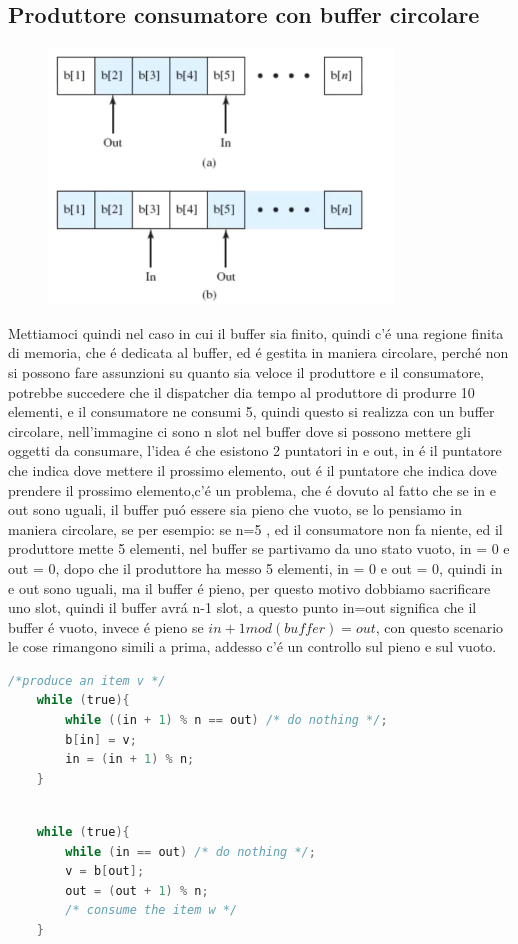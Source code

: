 \subsection{Produttore consumatore con buffer circolare}
\begin{figure}[H]
    \centering
    \includegraphics[width=0.7\linewidth]{immagini/ProduttoreConsumatoreBufferCircolare}
\end{figure}
Mettiamoci quindi nel caso in cui il buffer sia finito, quindi c'é una regione finita di memoria, che é dedicata al buffer,
ed é gestita in maniera circolare, perché non si possono fare assunzioni su quanto sia veloce il produttore e il consumatore,
potrebbe succedere che il dispatcher dia tempo al produttore di produrre 10 elementi, e il consumatore ne consumi 5, quindi
questo si realizza con un buffer circolare, nell'immagine ci sono n slot nel buffer dove si possono mettere gli oggetti da consumare,
l'idea é che esistono 2 puntatori in e out, in é il puntatore che indica dove mettere il prossimo elemento, out é il puntatore che
indica dove prendere il prossimo elemento,c'é un problema, che é dovuto al fatto che se in e out sono uguali, il buffer puó essere sia pieno
che vuoto, se lo pensiamo in maniera circolare, se per esempio: se n=5 , ed il consumatore non fa niente, ed il produttore mette 5 elementi,
nel buffer se partivamo da uno stato vuoto, in = 0 e out = 0, dopo che il produttore ha messo 5 elementi, in = 0 e out = 0, quindi in e out sono uguali,
ma il buffer é pieno, per questo motivo dobbiamo sacrificare uno slot, quindi il buffer avrá n-1 slot, a questo punto in=out significa che il buffer é vuoto,
invece é pieno se $in + 1 mod (buffer) = out$, con questo scenario le cose rimangono simili a prima, addesso c'é un controllo sul pieno e sul vuoto.
\begin{lstlisting}[language=C]
    /*produce an item v */
    while (true){
        while ((in + 1) % n == out) /* do nothing */;
        b[in] = v;
        in = (in + 1) % n;
    }
\end{lstlisting}
\begin{lstlisting}[language=C]

    while (true){
        while (in == out) /* do nothing */;
        v = b[out];
        out = (out + 1) % n;
        /* consume the item w */
    }
\end{lstlisting}

